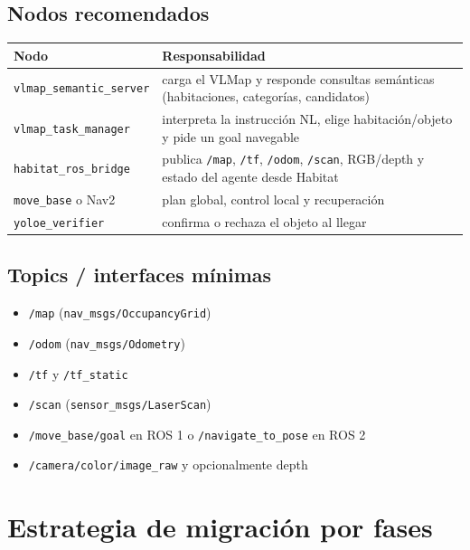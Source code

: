 \documentclass[11pt,a4paper]{article}
\begin{document}
\subsection{Nodos recomendados}

\begin{center}
\begin{tabular}{>{\raggedright\arraybackslash}p{4cm} >{\raggedright\arraybackslash}p{10cm}}
\toprule
\textbf{Nodo} & \textbf{Responsabilidad} \\
\midrule
\texttt{vlmap\_semantic\_server} & carga el VLMap y responde consultas semánticas (habitaciones, categorías, candidatos) \\
\texttt{vlmap\_task\_manager} & interpreta la instrucción NL, elige habitación/objeto y pide un goal navegable \\
\texttt{habitat\_ros\_bridge} & publica \texttt{/map}, \texttt{/tf}, \texttt{/odom}, \texttt{/scan}, RGB/depth y estado del agente desde Habitat \\
\texttt{move\_base} o Nav2 & plan global, control local y recuperación \\
\texttt{yoloe\_verifier} & confirma o rechaza el objeto al llegar \\
\bottomrule
\end{tabular}
\end{center}

\subsection{Topics / interfaces mínimas}

\begin{itemize}
  \item \texttt{/map} (\texttt{nav\_msgs/OccupancyGrid})
  \item \texttt{/odom} (\texttt{nav\_msgs/Odometry})
  \item \texttt{/tf} y \texttt{/tf\_static}
  \item \texttt{/scan} (\texttt{sensor\_msgs/LaserScan})
  \item \texttt{/move\_base/goal} en ROS 1 o \texttt{/navigate\_to\_pose} en ROS 2
  \item \texttt{/camera/color/image\_raw} y opcionalmente depth
\end{itemize}

\section{Estrategia de migración por fases}
\end{document}
